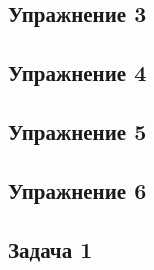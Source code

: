 \documentclass[a4paper]{article}
\begin{document}
\subsection*{Упражнение 3}
\subsection*{Упражнение 4}
\subsection*{Упражнение 5}
\subsection*{Упражнение 6}
\newpage
\subsection*{Задача 1}
\end{document}

